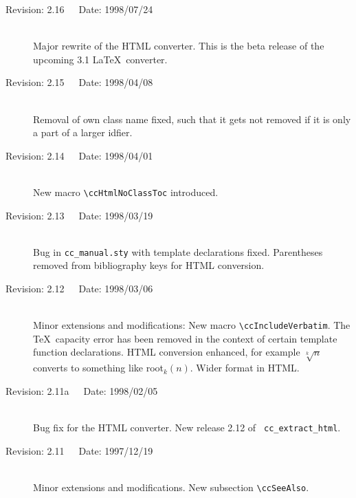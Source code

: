 \documentclass[11pt]{article}
\begin{document}
\begin{description}
    \item[Revision: 2.16~~~Date: 1998/07/24]~\\[3mm]
    Major rewrite of the HTML converter. This is the beta release of the
    upcoming 3.1 \LaTeX\ converter.

    \item[Revision: 2.15~~~Date: 1998/04/08]~\\[3mm]
    Removal of own class name fixed, such that it gets not removed
    if it is only a part of a larger idfier.

    \item[Revision: 2.14~~~Date: 1998/04/01]~\\[3mm]
    New macro \verb+\ccHtmlNoClassToc+ introduced.

    \item[Revision: 2.13~~~Date: 1998/03/19]~\\[3mm]
    Bug in {\tt cc\_manual.sty} with template declarations fixed.
    Parentheses removed from bibliography keys for HTML conversion.

    \item[Revision: 2.12~~~Date: 1998/03/06]~\\[3mm]
    Minor extensions and modifications: New macro \verb+\ccIncludeVerbatim+.
    The \TeX\ capacity error has been removed in the context of certain
    template function declarations.  HTML conversion enhanced, for example
    $\sqrt[k]{n}$ converts to something like root$_k(n)$. Wider format in HTML.

    \item[Revision: 2.11a~~~Date: 1998/02/05]~\\[3mm]
    Bug fix for the HTML converter. New release 2.12 of {\tt
    cc\_extract\_html}.

    \item[Revision: 2.11~~~Date: 1997/12/19]~\\[3mm]
    Minor extensions and modifications. New subsection \verb+\ccSeeAlso+.


\end{description}
\end{document}

